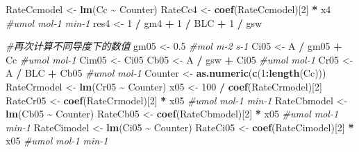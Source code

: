\documentclass[
]{krantz}
\makeatletter
\newenvironment{Shaded}{\begin{snugshade}}{\end{snugshade}}
\newcommand{\CommentTok}[1]{\textcolor[rgb]{0.56,0.35,0.01}{\textit{#1}}}
\newcommand{\DecValTok}[1]{\textcolor[rgb]{0.00,0.00,0.81}{#1}}
\newcommand{\FloatTok}[1]{\textcolor[rgb]{0.00,0.00,0.81}{#1}}
\newcommand{\KeywordTok}[1]{\textcolor[rgb]{0.13,0.29,0.53}{\textbf{#1}}}
\newcommand{\NormalTok}[1]{#1}
\newcommand{\OperatorTok}[1]{\textcolor[rgb]{0.81,0.36,0.00}{\textbf{#1}}}
\newcommand{\StringTok}[1]{\textcolor[rgb]{0.31,0.60,0.02}{#1}}
\newenvironment{kframe}{%
\medskip{}
\setlength{\fboxsep}{.8em}
 \def\at@end@of@kframe{}%
 \ifinner\ifhmode%
  \def\at@end@of@kframe{\end{minipage}}%
  \begin{minipage}{\columnwidth}%
 \fi\fi%
 \def\FrameCommand##1{\hskip\@totalleftmargin \hskip-\fboxsep
 \colorbox{shadecolor}{##1}\hskip-\fboxsep
     \hskip-\linewidth \hskip-\@totalleftmargin \hskip\columnwidth}%
 \MakeFramed {\advance\hsize-\width
   \@totalleftmargin\z@ \linewidth\hsize
   \@setminipage}}%
 {\par\unskip\endMakeFramed%
 \at@end@of@kframe}
\renewenvironment{Shaded}{\begin{kframe}}{\end{kframe}}
\makeatother
\begin{document}
\begin{Shaded}
\begin{Highlighting}[]
\NormalTok{RateCcmodel \textless{}{-}}\StringTok{ }\KeywordTok{lm}\NormalTok{(Cc }\OperatorTok{\textasciitilde{}}\StringTok{ }\NormalTok{Counter)}
\NormalTok{RateCc4 \textless{}{-}}\StringTok{ }\KeywordTok{coef}\NormalTok{(RateCcmodel)[}\DecValTok{2}\NormalTok{] }\OperatorTok{*}\StringTok{ }\NormalTok{x4 }\CommentTok{\#umol mol{-}1 min{-}1}
\NormalTok{res4 \textless{}{-}}\StringTok{ }\DecValTok{1} \OperatorTok{/}\StringTok{ }\NormalTok{gm4 }\OperatorTok{+}\StringTok{ }\DecValTok{1} \OperatorTok{/}\StringTok{ }\NormalTok{BLC }\OperatorTok{+}\StringTok{ }\DecValTok{1} \OperatorTok{/}\StringTok{ }\NormalTok{gsw}

\CommentTok{\#再次计算不同导度下的数值}
\NormalTok{gm05 \textless{}{-}}\StringTok{ }\FloatTok{0.5} \CommentTok{\#mol m{-}2 s{-}1}
\NormalTok{Ci05 \textless{}{-}}\StringTok{ }\NormalTok{A }\OperatorTok{/}\StringTok{ }\NormalTok{gm05 }\OperatorTok{+}\StringTok{ }\NormalTok{Cc }\CommentTok{\#umol mol{-}1}
\NormalTok{Cim05 \textless{}{-}}\StringTok{ }\NormalTok{Ci05}
\NormalTok{Cb05 \textless{}{-}}\StringTok{ }\NormalTok{A }\OperatorTok{/}\StringTok{ }\NormalTok{gsw }\OperatorTok{+}\StringTok{ }\NormalTok{Ci05 }\CommentTok{\#umol mol{-}1}
\NormalTok{Cr05 \textless{}{-}}\StringTok{ }\NormalTok{A }\OperatorTok{/}\StringTok{ }\NormalTok{BLC }\OperatorTok{+}\StringTok{ }\NormalTok{Cb05 }\CommentTok{\#umol mol{-}1}
\NormalTok{Counter \textless{}{-}}\StringTok{ }\KeywordTok{as.numeric}\NormalTok{(}\KeywordTok{c}\NormalTok{(}\DecValTok{1}\OperatorTok{:}\KeywordTok{length}\NormalTok{(Cc)))}
\NormalTok{RateCrmodel \textless{}{-}}\StringTok{ }\KeywordTok{lm}\NormalTok{(Cr05 }\OperatorTok{\textasciitilde{}}\StringTok{ }\NormalTok{Counter)}
\NormalTok{x05 \textless{}{-}}\StringTok{ }\DecValTok{100} \OperatorTok{/}\StringTok{ }\KeywordTok{coef}\NormalTok{(RateCrmodel)[}\DecValTok{2}\NormalTok{]}
\NormalTok{RateCr05 \textless{}{-}}\StringTok{ }\KeywordTok{coef}\NormalTok{(RateCrmodel)[}\DecValTok{2}\NormalTok{] }\OperatorTok{*}\StringTok{ }\NormalTok{x05 }\CommentTok{\#umol mol{-}1 min{-}1}
\NormalTok{RateCbmodel \textless{}{-}}\StringTok{ }\KeywordTok{lm}\NormalTok{(Cb05 }\OperatorTok{\textasciitilde{}}\StringTok{ }\NormalTok{Counter)}
\NormalTok{RateCb05 \textless{}{-}}\StringTok{ }\KeywordTok{coef}\NormalTok{(RateCbmodel)[}\DecValTok{2}\NormalTok{] }\OperatorTok{*}\StringTok{ }\NormalTok{x05 }\CommentTok{\#umol mol{-}1 min{-}1}
\NormalTok{RateCimodel \textless{}{-}}\StringTok{ }\KeywordTok{lm}\NormalTok{(Ci05 }\OperatorTok{\textasciitilde{}}\StringTok{ }\NormalTok{Counter)}
\NormalTok{RateCi05 \textless{}{-}}\StringTok{ }\KeywordTok{coef}\NormalTok{(RateCimodel)[}\DecValTok{2}\NormalTok{] }\OperatorTok{*}\StringTok{ }\NormalTok{x05 }\CommentTok{\#umol mol{-}1 min{-}1}

\end{Highlighting}
\end{Shaded}
\end{document}
